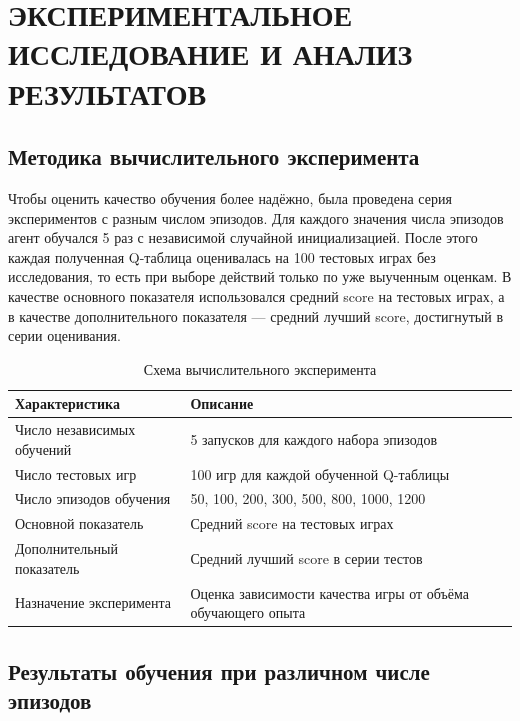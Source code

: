 \chapter{ЭКСПЕРИМЕНТАЛЬНОЕ ИССЛЕДОВАНИЕ И АНАЛИЗ РЕЗУЛЬТАТОВ}

\section{Методика вычислительного эксперимента}

Чтобы оценить качество обучения более надёжно, была проведена серия экспериментов с разным числом эпизодов. Для каждого значения числа эпизодов агент обучался 5 раз с независимой случайной инициализацией. После этого каждая полученная Q-таблица оценивалась на 100 тестовых играх без исследования, то есть при выборе действий только по уже выученным оценкам. В качестве основного показателя использовался средний score на тестовых играх, а в качестве дополнительного показателя --- средний лучший score, достигнутый в серии оценивания.

\begin{table}[H]
    \centering
    \caption{Схема вычислительного эксперимента}
    \begin{tabularx}{\textwidth}{>{\raggedright\arraybackslash}p{} X}
        \toprule
        Характеристика & Описание \\
        \midrule
        Число независимых обучений & 5 запусков для каждого набора эпизодов \\
        Число тестовых игр & 100 игр для каждой обученной Q-таблицы \\
        Число эпизодов обучения & 50, 100, 200, 300, 500, 800, 1000, 1200 \\
        Основной показатель & Средний score на тестовых играх \\
        Дополнительный показатель & Средний лучший score в серии тестов \\
        Назначение эксперимента & Оценка зависимости качества игры от объёма обучающего опыта \\
        \bottomrule
    \end{tabularx}
\end{table}

\section{Результаты обучения при различном числе эпизодов}

